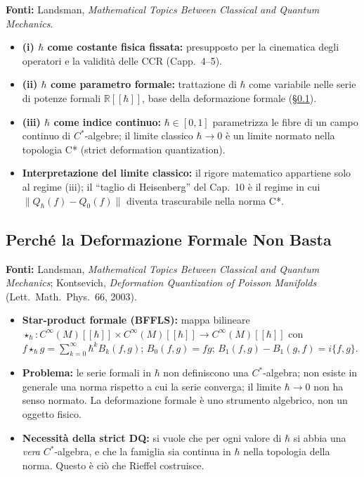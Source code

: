\documentclass[12pt, a4paper]{article}
\newcommand{\fonti}[1]{%
	\begin{fontebox}
		\textcolor{fontecolor}{\footnotesize\textbf{Fonti:} #1}
	\end{fontebox}%
}
\begin{document}
	\fonti{Landsman, \textit{Mathematical Topics Between Classical and Quantum Mechanics}.}
	
	\begin{itemize}
		\item \textbf{(i) $\hbar$ come costante fisica fissata:} presupposto per la
		cinematica degli operatori e la validità delle CCR (Capp.\ 4--5).
		\item \textbf{(ii) $\hbar$ come parametro formale:} trattazione di $\hbar$ come
		variabile nelle serie di potenze formali $\mathbb{R}[[\hbar]]$, base della
		deformazione formale (§\ref{sec:formalDQ}).
		\item \textbf{(iii) $\hbar$ come indice continuo:} $\hbar \in [0, 1]$ parametrizza
		le fibre di un campo continuo di $C^*$-algebre; il limite classico $\hbar \to 0$
		è un limite normato nella topologia C* (strict deformation quantization).
		\item \textbf{Interpretazione del limite classico:} il rigore matematico appartiene
		solo al regime (iii); il ``taglio di Heisenberg'' del Cap.\ 10 è il regime in cui
		$\|Q_\hbar(f) - Q_0(f)\|$ diventa trascurabile nella norma C*.
	\end{itemize}
	
	\subsection{Perché la Deformazione Formale Non Basta}
	\label{sec:formalDQ}
	
	\fonti{Landsman, \textit{Mathematical Topics Between Classical and Quantum Mechanics};
		Kontsevich, \textit{Deformation Quantization of Poisson Manifolds}
		(Lett.\ Math.\ Phys.\ 66, 2003).}
	
	\begin{itemize}
		\item \textbf{Star-product formale (BFFLS):} mappa bilineare $\star_\hbar:
		C^\infty(M)[[\hbar]] \times C^\infty(M)[[\hbar]] \to C^\infty(M)[[\hbar]]$ con
		$f \star_\hbar g = \sum_{k=0}^\infty \hbar^k B_k(f,g)$; $B_0(f,g) = fg$;
		$B_1(f,g) - B_1(g,f) = i\{f,g\}$.
		\item \textbf{Problema:} le serie formali in $\hbar$ non definiscono una
		$C^*$-algebra; non esiste in generale una norma rispetto a cui la serie converga;
		il limite $\hbar \to 0$ non ha senso normato. La deformazione formale è uno
		strumento algebrico, non un oggetto fisico.
		\item \textbf{Necessità della strict DQ:} si vuole che per ogni valore di $\hbar$
		si abbia una \emph{vera} $C^*$-algebra, e che la famiglia sia continua in $\hbar$
		nella topologia della norma. Questo è ciò che Rieffel costruisce.
	\end{itemize}
	
\end{document}
